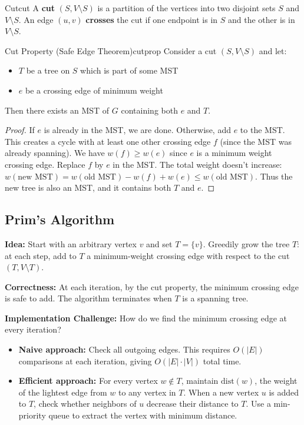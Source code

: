 \begin{definition}{Cut}{cut}
A \textbf{cut} $(S, V \setminus S)$ is a partition of the vertices into two disjoint sets 
$S$ and $V \setminus S$. An edge $(u,v)$ \textbf{crosses} the cut if one endpoint is in $S$ 
and the other is in $V \setminus S$.
\end{definition}

\begin{theorem}{Cut Property (Safe Edge Theorem)}{cutprop}
Consider a cut $(S, V \setminus S)$ and let:
\begin{itemize}[noitemsep]
  \item $T$ be a tree on $S$ which is part of some MST
  \item $e$ be a crossing edge of minimum weight
\end{itemize}
Then there exists an MST of $G$ containing both $e$ and $T$.
\end{theorem}

\begin{proof}
If $e$ is already in the MST, we are done. Otherwise, add $e$ to the MST. This creates a 
cycle with at least one other crossing edge $f$ (since the MST was already spanning). 
We have $w(f) \ge w(e)$ since $e$ is a minimum weight crossing edge. Replace $f$ by $e$ 
in the MST. The total weight doesn't increase: $w(\text{new MST}) = w(\text{old MST}) - w(f) + w(e) \le w(\text{old MST})$. 
Thus the new tree is also an MST, and it contains both $T$ and $e$.
\end{proof}

\subsection{Prim's Algorithm}

\textbf{Idea:} Start with an arbitrary vertex $v$ and set $T = \{v\}$. Greedily grow the 
tree $T$: at each step, add to $T$ a minimum-weight crossing edge with respect to the cut 
$(T, V \setminus T)$.

\textbf{Correctness:} At each iteration, by the cut property, the minimum crossing edge is 
safe to add. The algorithm terminates when $T$ is a spanning tree.

\textbf{Implementation Challenge:} How do we find the minimum crossing edge at every iteration?

\begin{itemize}[noitemsep]
  \item \textbf{Naive approach:} Check all outgoing edges. This requires $O(|E|)$ comparisons 
        at each iteration, giving $O(|E| \cdot |V|)$ total time.
  \item \textbf{Efficient approach:} For every vertex $w \notin T$, maintain $\text{dist}(w)$, 
        the weight of the lightest edge from $w$ to any vertex in $T$. When a new vertex $u$ 
        is added to $T$, check whether neighbors of $u$ decrease their distance to $T$. Use a 
        min-priority queue to extract the vertex with minimum distance.
\end{itemize}

